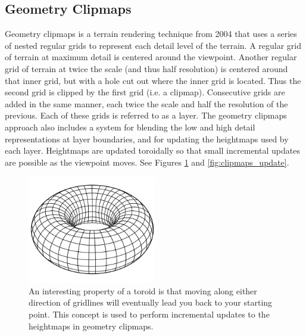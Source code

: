 \subsection{Geometry Clipmaps}

Geometry clipmaps is a terrain rendering technique from 2004 that uses a series of nested regular grids to represent each detail level of the terrain. \cite{geometry_clipmaps}
A regular grid of terrain at maximum detail is centered around the viewpoint.
Another regular grid of terrain at twice the scale (and thus half resolution) is centered around that inner grid, but with a hole cut out where the inner grid is located.
Thus the second grid is clipped by the first grid (i.e. a clipmap).
Consecutive grids are added in the same manner, each twice the scale and half the resolution of the previous.
Each of these grids is referred to as a layer.
The geometry clipmaps approach also includes a system for blending the low and high detail representations at layer boundaries, and for updating the heightmaps used by each layer.
Heightmaps are updated toroidally so that small incremental updates are possible as the viewpoint moves.
See Figures \ref{fig:toroid} and \ref{fig:clipmaps_update}.

\begin{figure}
	\centering
		\includegraphics[width=0.5\textwidth]{figures/toroid.png}
	\caption{
		An interesting property of a toroid is that moving along either direction of gridlines will eventually lead you back to your starting point.
		This concept is used to perform incremental updates to the heightmaps in geometry clipmaps.
	}
	\label{fig:toroid}
\end{figure}

